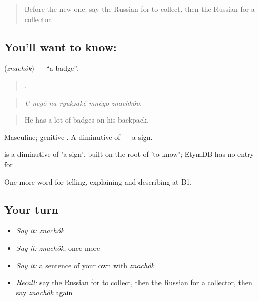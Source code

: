 \label{lesson:RU-C503-znachok}



\begin{quote}
Before the new one: say the Russian for to collect, then the Russian for a collector.
\end{quote}

\subsection*{You'll want to know: }
\textbf{} (\emph{znachók}) — \textquotedblleft{}a badge\textquotedblright{}.

\begin{quote}
     .
\end{quote}

\begin{quote}
\emph{U negó na ryukzaké mnógo znachkóv.}
\end{quote}

\begin{quote}
He has a lot of badges on his backpack.
\end{quote}

Masculine; genitive . A diminutive of \emph{} — a sign.

\begin{cousinweb}
\emph{} is a diminutive of \emph{} 'a sign', built on the root of \emph{} 'to know'; EtymDB has no entry for \emph{}.
\end{cousinweb}

\begin{grammarlens}[title={What you've built}]
One more word for telling, explaining and describing at B1.
\end{grammarlens}

\subsection*{Your turn}
\begin{itemize}
\raggedright
  \item \emph{Say it:} \emph{znachók}
  \item \emph{Say it:} \emph{znachók}, once more
  \item \emph{Say it:} a sentence of your own with \emph{znachók}
  \item \emph{Recall:} say the Russian for to collect, then the Russian for a collector, then say \emph{znachók} again
\end{itemize}

